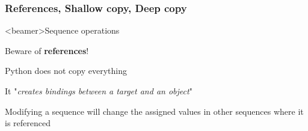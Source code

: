 \subsubsection{References, Shallow copy, Deep copy}


\begin{frame}<beamer>{Sequence operations}

   Beware of \textbf{references}!

  \bigskip

   Python does not copy everything

   It "\textit{creates bindings between a target and an object}"

  \bigskip

   Modifying a sequence will change the assigned values in other sequences where it is referenced

\end{frame}



